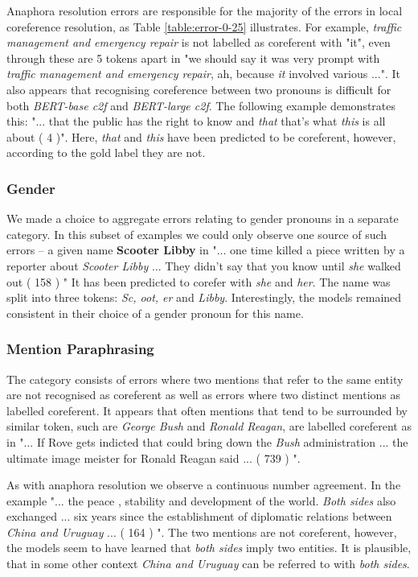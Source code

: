 \documentclass[11pt]{article}
\begin{document}
Anaphora resolution errors are responsible for the majority of the errors in local coreference resolution, as Table \ref{table:error-0-25} illustrates. For example, \textit{traffic management and emergency repair} is not labelled as coreferent with "it", even through these are 5 tokens apart in "we should say it was very prompt with \textit{traffic management and emergency repair}, ah, because \textit{it} involved various ...". It also appears that recognising coreference between two pronouns is difficult for both \textit{BERT-base c2f} and \textit{BERT-large c2f}. The following example demonstrates this: "... that the public has the right to know and \textit{that} that's what \textit{this} is all about ( 4 )". Here, \textit{that} and \textit{this} have been predicted to be coreferent, however, according to the gold label they are not.

\subsubsection{Gender}
We made a choice to aggregate errors relating to gender pronouns in a separate category. In this subset of examples we could only observe one source of such errors -- a given name \textbf{Scooter Libby} in "... one time killed a piece written by a reporter about \textit{Scooter Libby} ... They didn't say that you know until \textit{she} walked out ( 158 ) " It has been predicted to corefer with \textit{she} and \textit{her}. The name was split into three tokens: \textit{Sc, oot, er} and \textit{Libby}. Interestingly, the models remained consistent in their choice of a gender pronoun for this name. 


\subsubsection{Mention Paraphrasing} The category consists of errors where two mentions that refer to the same entity are not recognised as coreferent as well as errors where two distinct mentions as labelled coreferent. It appears that often mentions that tend to be surrounded by similar token, such are \textit{George Bush} and \textit{Ronald Reagan}, are labelled coreferent as in "... If Rove gets indicted that could bring down the \textit{Bush} administration ... the ultimate image meister for Ronald Reagan said ... ( 739 ) ". 

As with anaphora resolution we observe a continuous number agreement. In the example "... the peace , stability and development of the world. \textit{Both sides} also exchanged ... six years since the establishment of diplomatic relations between \textit{China and Uruguay} ... ( 164 ) ". The two mentions are not coreferent, however, the models seem to have learned that \textit{both sides} imply two entities. It is plausible, that in some other context \textit{China and Uruguay} can be referred to with \textit{both sides}.
\end{document}
